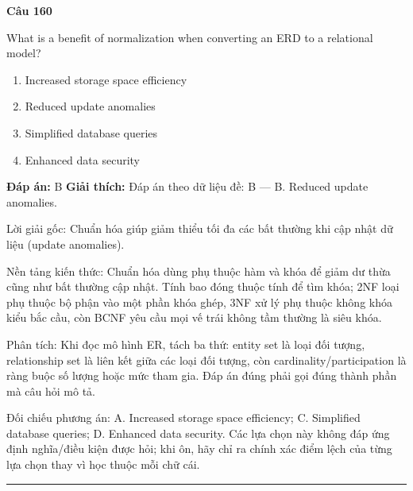 \documentclass[11pt,a4paper]{article}
\newenvironment{question}[1]{%
  \par\vspace{1em}\noindent\textbf{\large Câu #1}\par\vspace{0.4em}
}{%
  \par\vspace{1em}\hrule\vspace{0.6em}
}
\newenvironment{choices}{%
  \begin{enumerate}[label=\textbf{\Alph*.},leftmargin=2.2em,itemsep=2pt,topsep=3pt]
}{%
  \end{enumerate}
}
\newcommand{\choice}{\item}
\begin{document}
\begin{question}{160}
What is a benefit of normalization when converting an ERD to a relational model?
\begin{choices}
\choice Increased storage space efficiency
\choice Reduced update anomalies
\choice Simplified database queries
\choice Enhanced data security
\end{choices}
\textbf{Đáp án:} B
\textbf{Giải thích:} Đáp án theo dữ liệu đề: B — B. Reduced update anomalies.

Lời giải gốc: Chuẩn hóa giúp giảm thiểu tối đa các bất thường khi cập nhật dữ liệu (update anomalies).

Nền tảng kiến thức: Chuẩn hóa dùng phụ thuộc hàm và khóa để giảm dư thừa cũng như bất thường cập nhật. Tính bao đóng thuộc tính để tìm khóa; 2NF loại phụ thuộc bộ phận vào một phần khóa ghép, 3NF xử lý phụ thuộc không khóa kiểu bắc cầu, còn BCNF yêu cầu mọi vế trái không tầm thường là siêu khóa.

Phân tích: Khi đọc mô hình ER, tách ba thứ: entity set là loại đối tượng, relationship set là liên kết giữa các loại đối tượng, còn cardinality/participation là ràng buộc số lượng hoặc mức tham gia. Đáp án đúng phải gọi đúng thành phần mà câu hỏi mô tả.

Đối chiếu phương án: A. Increased storage space efficiency; C. Simplified database queries; D. Enhanced data security. Các lựa chọn này không đáp ứng định nghĩa/điều kiện được hỏi; khi ôn, hãy chỉ ra chính xác điểm lệch của từng lựa chọn thay vì học thuộc mỗi chữ cái.
\end{question}
\end{document}
